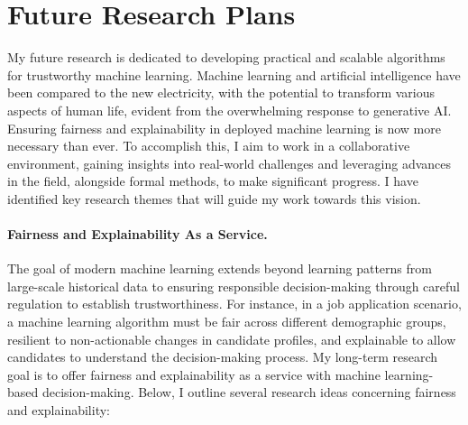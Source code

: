 \documentclass[10pt]{article}
\begin{document}
	
	

	
	
	
	

	\section*{Future Research Plans}
	
	
	
	 My future research is dedicated to developing practical and scalable algorithms for trustworthy machine learning. Machine learning and artificial intelligence have been compared to the new electricity, with the potential to transform various aspects of human life, evident from the overwhelming response to generative AI. Ensuring fairness and explainability in deployed machine learning is now more necessary than ever. To accomplish this, I aim to work in a collaborative environment, gaining insights into real-world challenges and leveraging advances in the field, alongside formal methods, to make significant progress. I have identified key research themes that will guide my work towards this vision.
	 
	 
	 	\paragraph{Fairness and Explainability As a Service.} 
	 	The goal of modern machine learning extends beyond learning patterns from large-scale historical data to ensuring responsible decision-making through careful regulation to establish trustworthiness. For instance, in a job application scenario, a machine learning algorithm must be fair across different demographic groups, resilient to non-actionable changes in candidate profiles, and explainable to allow candidates to understand the decision-making process. My long-term research goal is to offer fairness and explainability as a service with machine learning-based decision-making. Below, I outline several research ideas concerning fairness and explainability:
	 	
\end{document}
